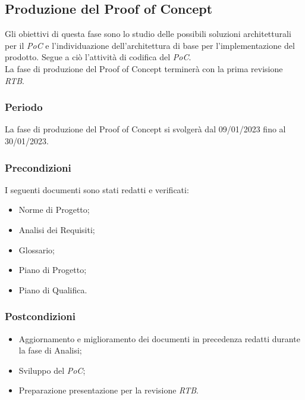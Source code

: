 \subsection{Produzione del Proof of Concept}
Gli obiettivi di questa fase sono lo studio delle possibili soluzioni architetturali per il \textit{PoC} e l’individuazione dell’architettura di base per l’implementazione del prodotto. Segue a ciò l’attività di codifica del \textit{PoC}.\\
La fase di produzione del Proof of Concept terminerà con la prima revisione \textit{RTB}.

\subsubsection{Periodo}
La fase di produzione del Proof of Concept si svolgerà dal 09/01/2023 fino al 30/01/2023.

\subsubsection{Precondizioni}
I seguenti documenti sono stati redatti e verificati:
\begin{itemize}
	\item Norme di Progetto;
	\item Analisi dei Requisiti;
	\item Glossario;
    \item Piano di Progetto;
	\item Piano di Qualifica.
\end{itemize}

\subsubsection{Postcondizioni}
\begin{itemize}
	\item Aggiornamento e miglioramento dei documenti in precedenza redatti durante la fase di Analisi;
	\item Sviluppo del \textit{PoC};
	\item Preparazione presentazione per la revisione \textit{RTB}.
\end{itemize}

